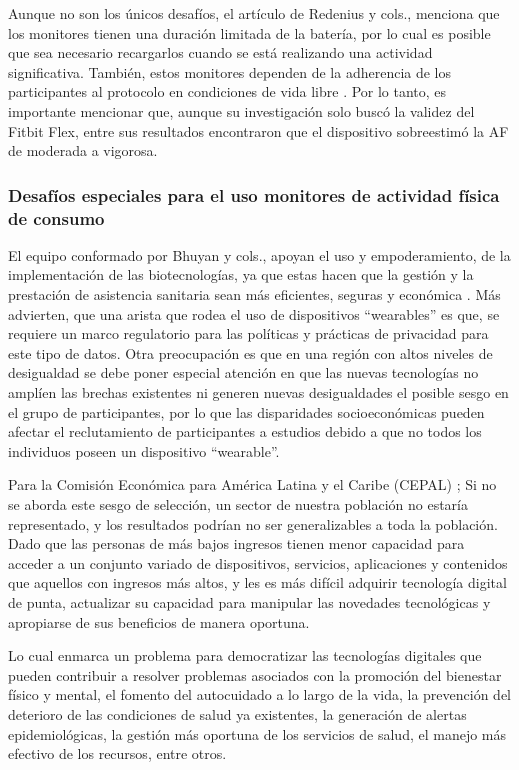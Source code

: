 Aunque no son los únicos desafíos, el artículo de Redenius y cols., menciona que los monitores tienen una duración limitada de la batería, por lo cual es posible que sea necesario recargarlos cuando se está realizando una actividad significativa. También, estos monitores dependen de la adherencia de los participantes al protocolo en condiciones de vida libre \citep{Redenius2019Fitbit}. Por lo tanto, es importante mencionar que, aunque su investigación solo buscó la validez del Fitbit Flex, entre sus resultados encontraron que el dispositivo sobreestimó la AF de moderada a vigorosa.

\subsubsection{Desafíos especiales para el uso monitores de actividad física de consumo}
\label{subsubsec:desafios_monitores_af}

El equipo conformado por Bhuyan y cols., apoyan el uso y empoderamiento, de la implementación de las biotecnologías, ya que estas hacen que la gestión y la prestación de asistencia sanitaria sean más eficientes, seguras y económica \citep{Bhuyan2016Mobile}. Más advierten, que una arista que rodea el uso de dispositivos ``wearables'' es que, se requiere un marco regulatorio para las políticas y prácticas de privacidad para este tipo de datos. Otra preocupación es que en una región con altos niveles de desigualdad se debe poner especial atención en que las nuevas tecnologías no amplíen las brechas existentes ni generen nuevas desigualdades el posible sesgo en el grupo de participantes, por lo que las disparidades socioeconómicas pueden afectar el reclutamiento de participantes a estudios debido a que no todos los individuos poseen un dispositivo ``wearable''.

Para la Comisión Económica para América Latina y el Caribe (CEPAL) \citep{Martinez2020Revolucion}; Si no se aborda este sesgo de selección, un sector de nuestra población no estaría representado, y los resultados podrían no ser generalizables a toda la población. Dado que las personas de más bajos ingresos tienen menor capacidad para acceder a un conjunto variado de dispositivos, servicios, aplicaciones y contenidos que aquellos con ingresos más altos, y les es más difícil adquirir tecnología digital de punta, actualizar su capacidad para manipular las novedades tecnológicas y apropiarse de sus beneficios de manera oportuna.

Lo cual enmarca un problema para democratizar las tecnologías digitales que pueden contribuir a resolver problemas asociados con la promoción del bienestar físico y mental, el fomento del autocuidado a lo largo de la vida, la prevención del deterioro de las condiciones de salud ya existentes, la generación de alertas epidemiológicas, la gestión más oportuna de los servicios de salud, el manejo más efectivo de los recursos, entre otros.

